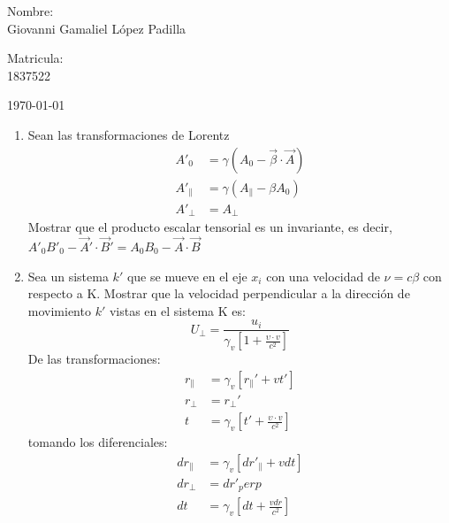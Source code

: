 \documentclass[12pt,letterpaper]{report}
\begin{document}
\begin{titlepage}
\begin{center}
\begin{minipage}{0.6\linewidth}
\vspace{0.5cm}
\changefontsizes{14pt}
Nombre:\\
Giovanni Gamaliel López Padilla\\
\end{minipage}
\begin{minipage}{0.2\linewidth}
\changefontsizes{14pt}
Matricula:\\
1837522
\end{minipage}
\end{center}
\vspace{4cm}
\begin{flushright}
\today
\end{flushright}
\end{titlepage}
\begin{enumerate}
    \item Sean las transformaciones de Lorentz
    \begin{align*}
        {A}'_0&=\gamma (A_0-\vec{\beta}\cdot \vec{A})\\
        {A}'_\parallel&=\gamma (A_\parallel - \beta A_0)\\
        {A}'_\perp &= A_\perp
        \end{align*}
    Mostrar que el producto escalar tensorial es un invariante, es decir, \\${A}'_0{B}'_0-\vec{A}'\cdot\vec{B}'={A}_0{B}_0-\vec{A}\cdot\vec{B}$
    \item Sea un sistema ${k}'$ que se mueve en el eje $x_i$ con una velocidad de $\nu = c\beta$ con respecto a K. Mostrar que la velocidad
    perpendicular a la dirección de movimiento ${k}'$ vistas en el sistema K es:
    \begin{equation*}
        U_\perp=\frac{u_i}{\gamma_v \left[1+\frac{\upsilon \cdot v}{c^2} \right]}
    \end{equation*}
    De las transformaciones:
    \begin{align*}
        r_\parallel &= \gamma_v [{r_\parallel}'+v{t}']\\
        r_\perp &= {r_\perp}'\\
        t&= \gamma_v \left[ {t}'+\frac{\upsilon \cdot v}{c^2}\right]
    \end{align*}
    tomando los diferenciales:
    \begin{align*}
        dr_\parallel &= \gamma_v \left[{dr}'_\parallel + vdt\right]\\
        dr_\perp &= {dr}'_perp\\
        dt&=\gamma_v \left[dt+ \frac{vdr}{c^2} \right]

\end{align*}
\end{enumerate}
\end{document}
